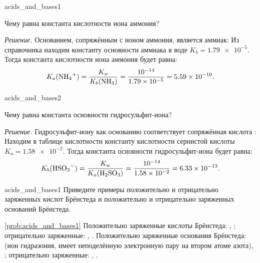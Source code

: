 \begin{example}{}{acids_and_bases1}
    \begin{condition}
        Чему равна константа кислотности иона аммония?
    \end{condition}

    \medskip

    \textit{Решение.} Основанием, сопряжённым с ионом аммония, является аммиак:
    Из справочника находим константу основности аммиака в воде $K_b = \num{1,79e-5}$. Тогда константа кислотности иона аммония будет равна:
    \begin{equation*}
        K_a(\ce{NH4^+}) = \frac{K_w}{K_b(\ce{NH3})} = \frac{\num{e-14}}{\num{1,79e-5}} = \num{5,59e-10}.
    \end{equation*}
\end{example}

\begin{example}{}{acids_and_bases2}
    \begin{condition}
        Чему равна константа основности гидросульфит-иона?
    \end{condition}

    \medskip

    \textit{Решение.} Гидросульфит-иону как основанию соответствует сопряжённая кислота :
    Находим в таблице кислотности константу кислотности сернистой кислоты $K_a = \num{1,58e-2}$. Тогда константа основности гидросульфит-иона будет равна:
    \begin{equation*}
        K_b(\ce{HSO3^-}) = \frac{K_w}{K_a(\ce{H2SO3})} = \frac{\num{e-14}}{\num{1,58e-2}} = \num{6,33e-13}.
    \end{equation*}
\end{example}

\begin{problem}{}{acids_and_bases1}
    Приведите примеры положительно и отрицательно заряженных кислот Брёнстеда и положительно и отрицательно заряженных оснований Брёнстеда.
    \begin{sol}{\ref{prob:acids_and_bases1}}
        Положительно заряженные кислоты Брёнстеда: , ; отрицательно заряженные: , . Положительно заряженные основания Брёнстеда:  (ион гидразония, имеет неподелённую электронную пару на втором атоме азота), ; отрицательно заряженные: , .
    \end{sol}
\end{problem}

